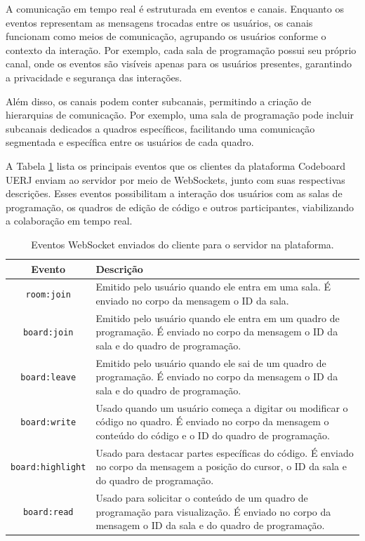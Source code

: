A comunicação em tempo real é estruturada em eventos e canais. Enquanto os eventos representam as mensagens trocadas entre os usuários, os canais funcionam como meios de comunicação, agrupando os usuários conforme o contexto da interação. Por exemplo, cada sala de programação possui seu próprio canal, onde os eventos são visíveis apenas para os usuários presentes, garantindo a privacidade e segurança das interações.

Além disso, os canais podem conter subcanais, permitindo a criação de hierarquias de comunicação. Por exemplo, uma sala de programação pode incluir subcanais dedicados a quadros específicos, facilitando uma comunicação segmentada e específica entre os usuários de cada quadro.

A Tabela \ref{tab:websocket-client-to-server-events}  lista os principais eventos que os clientes da plataforma Codeboard UERJ enviam ao servidor por meio de WebSockets, junto com suas respectivas descrições. Esses eventos possibilitam a interação dos usuários com as salas de programação, os quadros de edição de código e outros participantes, viabilizando a colaboração em tempo real.

\begin{table}[H]
    \centering
    \renewcommand{\arraystretch}{1.3} 
    \begin{tabular}{|c|p{10cm}|}
        \hline
        \textbf{Evento} & \textbf{Descrição} \\
        \hline
        \texttt{room:join} & Emitido pelo usuário quando ele entra em uma sala. É enviado no corpo da mensagem o ID da sala. \\
        \hline
        \texttt{board:join} & Emitido pelo usuário quando ele entra em um quadro de programação. É enviado no corpo da mensagem o ID da sala e do quadro de programação. \\
        \hline
        \texttt{board:leave} & Emitido pelo usuário quando ele sai de um quadro de programação. É enviado no corpo da mensagem o ID da sala e do quadro de programação. \\
        \hline
        \texttt{board:write} & Usado quando um usuário começa a digitar ou modificar o código no quadro. É enviado no corpo da mensagem o conteúdo do código e o ID do quadro de programação. \\
        \hline
        \texttt{board:highlight} & Usado para destacar partes específicas do código. É enviado no corpo da mensagem a posição do cursor, o ID da sala e do quadro de programação. \\
        \hline
        \texttt{board:read} & Usado para solicitar o conteúdo de um quadro de programação para visualização. É enviado no corpo da mensagem o ID da sala e do quadro de programação. \\
        \hline
    \end{tabular}
    \caption{Eventos WebSocket enviados do cliente para o servidor na plataforma.}
    \label{tab:websocket-client-to-server-events}
\end{table}


